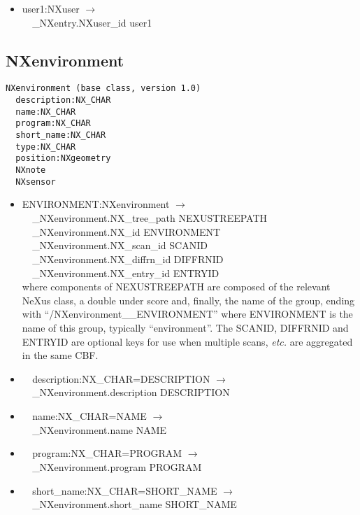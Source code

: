 \documentclass[11pt]{article}
\begin{document}
{{\begin{itemize}
\item{user1:NXuser $\rightarrow$\\
\verb|  |\_NXentry.NXuser\_id user1}
\end{itemize}
\subsection{NXenvironment}

\begin{verbatim}
NXenvironment (base class, version 1.0)
  description:NX_CHAR
  name:NX_CHAR
  program:NX_CHAR
  short_name:NX_CHAR
  type:NX_CHAR
  position:NXgeometry
  NXnote
  NXsensor
\end{verbatim}

\begin{itemize}

\item{ENVIRONMENT:NXenvironment $\rightarrow$\\
\verb|  |\_NXenvironment.NX\_tree\_path    NEXUSTREEPATH \\
\verb|  |\_NXenvironment.NX\_id            ENVIRONMENT\\
\verb|  |\_NXenvironment.NX\_scan\_id      SCANID \\
\verb|  |\_NXenvironment.NX\_diffrn\_id    DIFFRNID \\
\verb|  |\_NXenvironment.NX\_entry\_id     ENTRYID \\
where components of NEXUSTREEPATH are composed of the
relevant NeXus class, a double under score and, finally, the
name of the group, ending with ``/NXenvironment\_\_ENVIRONMENT''
where ENVIRONMENT is the name of this group, typically ``environment''.
The SCANID, DIFFRNID and ENTRYID are optional keys for use
when multiple scans, {\it etc.} are aggregated in the same CBF.}

\item{\verb|  |description:NX\_CHAR=DESCRIPTION $\rightarrow$\\
\verb|  |\_NXenvironment.description DESCRIPTION}

\item{\verb|  |name:NX\_CHAR=NAME $\rightarrow$\\
\verb|  |\_NXenvironment.name NAME}

\item{\verb|  |program:NX\_CHAR=PROGRAM $\rightarrow$\\
\verb|  |\_NXenvironment.program PROGRAM}

\item{\verb|  |short\_name:NX\_CHAR=SHORT\_NAME $\rightarrow$\\
\verb|  |\_NXenvironment.short\_name SHORT\_NAME}


\end{itemize}}}
\end{document}
